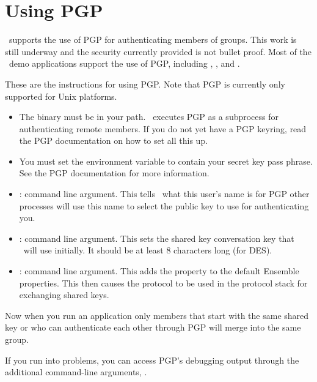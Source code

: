 \section{Using PGP}

\ensemble\ supports the use of PGP for authenticating members of
groups.  This work is still underway and the security currently
provided is not bullet proof.  Most of the \ensemble\ demo
applications support the use of PGP, including ,
, and .

These are the instructions for using PGP.  Note that PGP is currently
only supported for Unix platforms.

\begin{itemize}
\item
The  binary must be in your path.  \ensemble\ executes PGP
as a subprocess for authenticating remote members.  If you do not yet
have a PGP keyring, read the PGP documentation on how to set all this
up.
\item
You must set the  environment variable to contain your
secret key pass phrase.  See the PGP documentation for more
information.
\item
{} : command line argument.  This tells \ensemble\ what
this user's name is for PGP other processes will use this name to
select the public key to use for authenticating you.
\item
{}: command line argument.  This sets the shared
key conversation key that \ensemble\ will use initially.  It should
be at least $8$ characters long (for DES).
\item
{}: command line argument.  This adds the
 property to the default Ensemble properties.  This then
causes the  protocol to be used in the protocol stack
for exchanging shared keys.
\end{itemize}

Now when you run an application only members that start with the same
shared key or who can authenticate each other through PGP will
merge into the same group.

If you run into problems, you can access PGP's debugging output
through the additional command-line arguments, .

